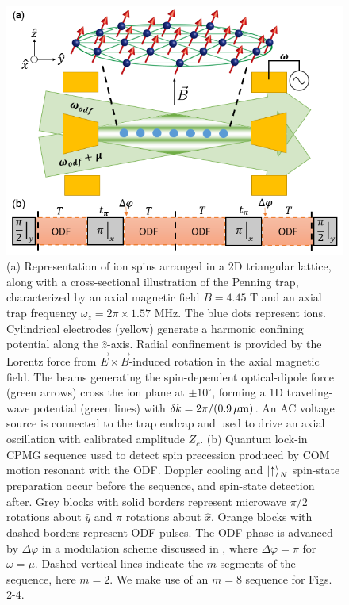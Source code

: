 \documentclass[aps,prl,twocolumn,superscriptaddress,floatfix]{revtex4-1}
\begin{document}
\begin{figure}
    \centering
    \includegraphics[width=\columnwidth]{expt}
    \caption{(a) Representation of ion spins arranged in a 2D triangular lattice, along with a cross-sectional illustration of the Penning trap, characterized by an axial magnetic field $B = 4.45$ T and an axial trap frequency $\omega_z = 2\pi \times 1.57$ MHz. The blue dots represent ions. Cylindrical electrodes (yellow) generate a harmonic confining potential along the $\hat{z}$-axis. Radial confinement is provided by the Lorentz force from $\vec{E} \times \vec{B}$-induced rotation in the axial magnetic field. The beams generating the spin-dependent optical-dipole force (green arrows) cross the ion plane at $\pm 10^{\circ}$, forming a 1D traveling-wave potential (green lines) with $\delta k = 2 \pi /(0.9 \, \mu \rm{m})$. An AC voltage source is connected to the trap endcap and used to drive an axial oscillation with calibrated amplitude $Z_c$. (b) Quantum lock-in CPMG sequence used to detect spin precession produced by COM motion resonant with the ODF. Doppler cooling and $\ket{\uparrow}_N$ spin-state preparation occur before the sequence, and spin-state detection after. Grey blocks with solid borders represent microwave $\pi/2$ rotations about $\hat{y}$ and $\pi$ rotations about $\hat{x}$. Orange blocks with dashed borders represent ODF pulses. The ODF phase is advanced by $\Delta\varphi$ in a modulation scheme discussed in \citep{SuppMat}, where $\Delta\varphi = \pi$ for $\omega = \mu$. Dashed vertical lines indicate the $m$ segments of the sequence, here $m = 2$. We make use of an $m = 8$ sequence for Figs. 2-4.} 
    \label{Expt}
\end{figure}
\end{document}
